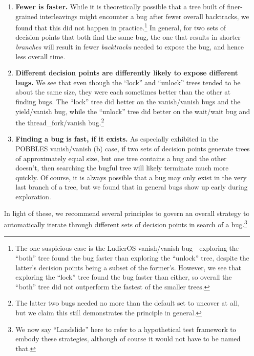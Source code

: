 \begin{enumerate}
	\item {\bf Fewer is faster.} While it is theoretically possible that a tree built of finer-grained interleavings might encounter a bug after fewer overall backtracks, we found that this did not happen in practice.\footnote{
		The one suspicious case is the LudicrOS vanish/vanish bug - exploring the ``both'' tree found the bug faster than exploring the ``unlock'' tree, despite the latter's decision points being a subset of the former's. However, we see that exploring the ``lock'' tree found the bug faster than either, so overall the ``both'' tree did not outperform the fastest of the smaller trees.}
		In general, for two sets of decision points that both find the same bug, the one that results in shorter {\em branches} will result in fewer {\em backtracks} needed to expose the bug, and hence less overall time.
	\item {\bf Different decision points are differently likely to expose different bugs.} We see that even though the ``lock'' and ``unlock'' trees tended to be about the same size, they were each sometimes better than the other at finding bugs. The ``lock'' tree did better on the vanish/vanish bugs and the yield/vanish bug, while the ``unlock'' tree did better on the wait/wait bug and the thread\_fork/vanish bug.\footnote{
	The latter two bugs needed no more than the default set to uncover at all, but we claim this still demonstrates the principle in general.}
	\item {\bf Finding a bug is fast, if it exists.} As especially exhibited in the POBBLES vanish/vanish (b) case, if two sets of decision points generate trees of approximately equal size, but one tree contains a bug and the other doesn't, then searching the bugful tree will likely terminate much more quickly.
	Of course, it is always possible that a bug may only exist in the very last branch of a tree, but we found that in general bugs show up early during exploration.
\end{enumerate}


In light of these, we recommend several principles to govern an overall strategy to automatically iterate through different sets of decision points in search of a bug.\footnote{
We now say ``Landslide'' here to refer to a hypothetical test framework to embody these strategies, although of course it would not have to be named that.}

